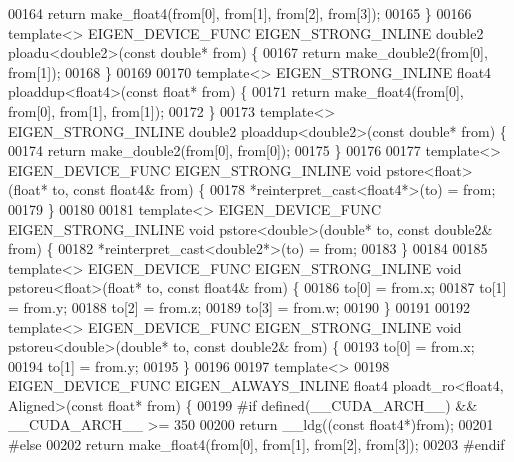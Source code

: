 \begin{DoxyCode}
00164   \textcolor{keywordflow}{return} make\_float4(from[0], from[1], from[2], from[3]);
00165 \}
00166 \textcolor{keyword}{template}<> EIGEN\_DEVICE\_FUNC EIGEN\_STRONG\_INLINE double2 ploadu<double2>(\textcolor{keyword}{const} \textcolor{keywordtype}{double}* from) \{
00167   \textcolor{keywordflow}{return} make\_double2(from[0], from[1]);
00168 \}
00169 
00170 \textcolor{keyword}{template}<> EIGEN\_STRONG\_INLINE float4 ploaddup<float4>(\textcolor{keyword}{const} \textcolor{keywordtype}{float}*   from) \{
00171   \textcolor{keywordflow}{return} make\_float4(from[0], from[0], from[1], from[1]);
00172 \}
00173 \textcolor{keyword}{template}<> EIGEN\_STRONG\_INLINE double2 ploaddup<double2>(\textcolor{keyword}{const} \textcolor{keywordtype}{double}*  from) \{
00174   \textcolor{keywordflow}{return} make\_double2(from[0], from[0]);
00175 \}
00176 
00177 \textcolor{keyword}{template}<> EIGEN\_DEVICE\_FUNC EIGEN\_STRONG\_INLINE \textcolor{keywordtype}{void} pstore<float>(\textcolor{keywordtype}{float}*   to, \textcolor{keyword}{const} float4& from) \{
00178   *\textcolor{keyword}{reinterpret\_cast<}float4*\textcolor{keyword}{>}(to) = from;
00179 \}
00180 
00181 \textcolor{keyword}{template}<> EIGEN\_DEVICE\_FUNC EIGEN\_STRONG\_INLINE \textcolor{keywordtype}{void} pstore<double>(\textcolor{keywordtype}{double}* to, \textcolor{keyword}{const} double2& from) \{
00182   *\textcolor{keyword}{reinterpret\_cast<}double2*\textcolor{keyword}{>}(to) = from;
00183 \}
00184 
00185 \textcolor{keyword}{template}<> EIGEN\_DEVICE\_FUNC EIGEN\_STRONG\_INLINE \textcolor{keywordtype}{void} pstoreu<float>(\textcolor{keywordtype}{float}*  to, \textcolor{keyword}{const} float4& from) \{
00186   to[0] = from.x;
00187   to[1] = from.y;
00188   to[2] = from.z;
00189   to[3] = from.w;
00190 \}
00191 
00192 \textcolor{keyword}{template}<> EIGEN\_DEVICE\_FUNC EIGEN\_STRONG\_INLINE \textcolor{keywordtype}{void} pstoreu<double>(\textcolor{keywordtype}{double}* to, \textcolor{keyword}{const} double2& from) \{
00193   to[0] = from.x;
00194   to[1] = from.y;
00195 \}
00196 
00197 \textcolor{keyword}{template}<>
00198 EIGEN\_DEVICE\_FUNC EIGEN\_ALWAYS\_INLINE float4 ploadt\_ro<float4, Aligned>(\textcolor{keyword}{const} \textcolor{keywordtype}{float}* from) \{
00199 \textcolor{preprocessor}{#if defined(\_\_CUDA\_ARCH\_\_) && \_\_CUDA\_ARCH\_\_ >= 350}
00200   \textcolor{keywordflow}{return} \_\_ldg((\textcolor{keyword}{const} float4*)from);
00201 \textcolor{preprocessor}{#else}
00202   \textcolor{keywordflow}{return} make\_float4(from[0], from[1], from[2], from[3]);
00203 \textcolor{preprocessor}{#endif}

\end{DoxyCode}
